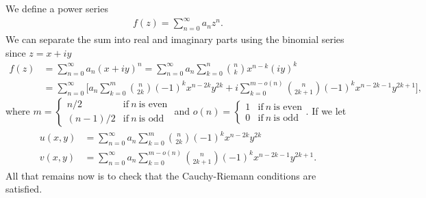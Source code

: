 \def\duedate{11/03/22}
\def\HWnum{8}



    

We define a power series
\begin{eqnarray}
    \label{eq:power-series}
    f(z) = \sum_{n=0}^{\infty} a_{n} z^{n} 
.\end{eqnarray}
We can separate the sum into real and imaginary parts using the binomial series since $z = x+iy$
\begin{align}
    \label{eq:rewrite-power-series}
    f(z) &= \sum_{n=0}^{\infty} a_{n} (x+iy)^{n} = \sum_{n=0}^{\infty} a_{n} \sum_{k=0}^{n} \binom{n}{k} x^{n-k}(iy)^{k} \\
    &= \sum_{n=0}^{\infty} \Big[ a_{n} \sum_{k=0}^{m} \binom{n}{2k} (-1)^{k} x^{n-2k}y^{2k} + i\sum_{k=0}^{m-o(n)} \binom{n}{2k+1} (-1)^{k} x^{n-2k-1}y^{2k+1} \Big]
,\end{align}
where $\displaystyle m = \begin{cases} n/2 & \mbox{if}~n~\mbox{is even} \\ (n-1)/2 & \mbox{if}~n~\mbox{is odd} \end{cases}$ and $\displaystyle o(n) = \begin{cases} 1 & \mbox{if}~n~\mbox{is even} \\ 0 & \mbox{if}~n~\mbox{is odd} \end{cases}$.
If we let 
\begin{eqnarray}
\label{eq:u-v-def}
\begin{aligned}
    u(x,y) &= \sum_{n=0}^{\infty} a_{n} \sum_{k=0}^{m} \binom{n}{2k} (-1)^{k} x^{n-2k}y^{2k} \\
    v(x,y) &= \sum_{n=0}^{\infty} a_{n} \sum_{k=0}^{m-o(n)} \binom{n}{2k+1} (-1)^{k} x^{n-2k-1}y^{2k+1}
.\end{aligned}
\end{eqnarray}
All that remains now is to check that the Cauchy-Riemann conditions are satisfied.
